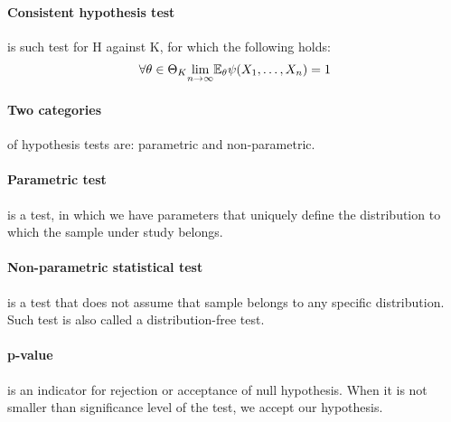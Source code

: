 \paragraph{Consistent hypothesis test}
is such test for H against K, for which the following holds:
\begin{gather*}
\forall \theta \in \Theta_K \underset{n \rightarrow \infty}{\lim} \mathbb{E}_\theta \psi(X_{1}, \ldots, X_{n}) = 1
\end{gather*}

\paragraph{Two categories}
of hypothesis tests are: parametric and non-parametric.

\paragraph{Parametric test}
is a test, in which we have parameters that uniquely define the distribution to which the sample
under study belongs.

\paragraph{Non-parametric statistical test}
is a test that does not assume that sample belongs to any specific distribution. Such test is also
called a distribution-free test.

\paragraph{p-value}
is an indicator for rejection or acceptance of null hypothesis. When it is not smaller than
significance level of the test, we accept our hypothesis.
